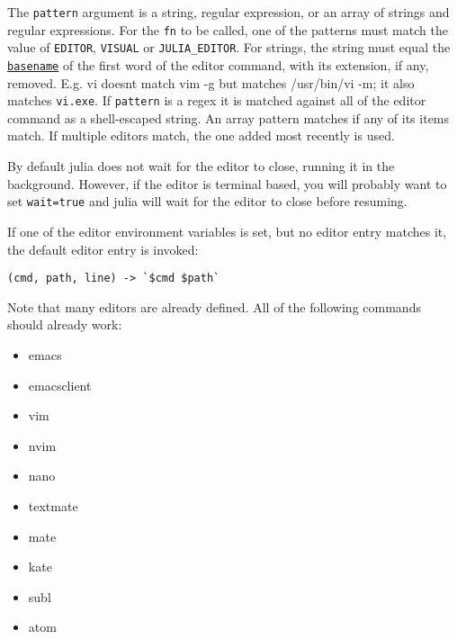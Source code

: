 \begin{adjustwidth}{2em}{0pt}
The \texttt{pattern} argument is a string, regular expression, or an array of strings and regular expressions. For the \texttt{fn} to be called, one of the patterns must match the value of \texttt{EDITOR}, \texttt{VISUAL} or \texttt{JULIA\_EDITOR}. For strings, the string must equal the \hyperlink{16452154606861459390}{\texttt{basename}} of the first word of the editor command, with its extension, if any, removed. E.g. {\textquotedbl}vi{\textquotedbl} doesn{\textquotesingle}t match {\textquotedbl}vim -g{\textquotedbl} but matches {\textquotedbl}/usr/bin/vi -m{\textquotedbl}; it also matches \texttt{vi.exe}. If \texttt{pattern} is a regex it is matched against all of the editor command as a shell-escaped string. An array pattern matches if any of its items match. If multiple editors match, the one added most recently is used.

By default julia does not wait for the editor to close, running it in the background. However, if the editor is terminal based, you will probably want to set \texttt{wait=true} and julia will wait for the editor to close before resuming.

If one of the editor environment variables is set, but no editor entry matches it, the default editor entry is invoked:


\begin{lstlisting}
(cmd, path, line) -> `$cmd $path`
\end{lstlisting}

Note that many editors are already defined. All of the following commands should already work:

\begin{itemize}
\item emacs


\item emacsclient


\item vim


\item nvim


\item nano


\item textmate


\item mate


\item kate


\item subl


\item atom



\end{itemize}
\end{adjustwidth}
